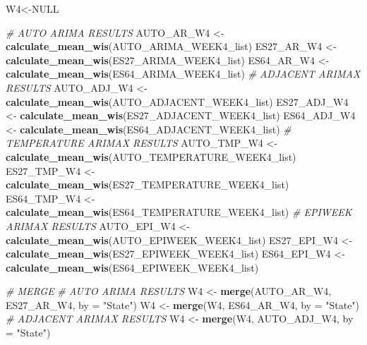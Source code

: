 \documentclass[
]{article}
\newenvironment{Shaded}{\begin{snugshade}}{\end{snugshade}}
\newcommand{\AttributeTok}[1]{\textcolor[rgb]{0.13,0.29,0.53}{#1}}
\newcommand{\CommentTok}[1]{\textcolor[rgb]{0.56,0.35,0.01}{\textit{#1}}}
\newcommand{\ConstantTok}[1]{\textcolor[rgb]{0.56,0.35,0.01}{#1}}
\newcommand{\FunctionTok}[1]{\textcolor[rgb]{0.13,0.29,0.53}{\textbf{#1}}}
\newcommand{\NormalTok}[1]{#1}
\newcommand{\OtherTok}[1]{\textcolor[rgb]{0.56,0.35,0.01}{#1}}
\newcommand{\StringTok}[1]{\textcolor[rgb]{0.31,0.60,0.02}{#1}}
\begin{document}
\begin{Shaded}
\begin{Highlighting}[]
\NormalTok{W4}\OtherTok{\textless{}{-}}\ConstantTok{NULL}

\CommentTok{\# AUTO ARIMA RESULTS}
\NormalTok{AUTO\_AR\_W4 }\OtherTok{\textless{}{-}} \FunctionTok{calculate\_mean\_wis}\NormalTok{(AUTO\_ARIMA\_WEEK4\_list)}
\NormalTok{ES27\_AR\_W4 }\OtherTok{\textless{}{-}} \FunctionTok{calculate\_mean\_wis}\NormalTok{(ES27\_ARIMA\_WEEK4\_list)}
\NormalTok{ES64\_AR\_W4 }\OtherTok{\textless{}{-}} \FunctionTok{calculate\_mean\_wis}\NormalTok{(ES64\_ARIMA\_WEEK4\_list)}
\CommentTok{\# ADJACENT ARIMAX RESULTS}
\NormalTok{AUTO\_ADJ\_W4 }\OtherTok{\textless{}{-}} \FunctionTok{calculate\_mean\_wis}\NormalTok{(AUTO\_ADJACENT\_WEEK4\_list)}
\NormalTok{ES27\_ADJ\_W4 }\OtherTok{\textless{}{-}} \FunctionTok{calculate\_mean\_wis}\NormalTok{(ES27\_ADJACENT\_WEEK4\_list)}
\NormalTok{ES64\_ADJ\_W4 }\OtherTok{\textless{}{-}} \FunctionTok{calculate\_mean\_wis}\NormalTok{(ES64\_ADJACENT\_WEEK4\_list)}
\CommentTok{\# TEMPERATURE ARIMAX RESULTS}
\NormalTok{AUTO\_TMP\_W4 }\OtherTok{\textless{}{-}} \FunctionTok{calculate\_mean\_wis}\NormalTok{(AUTO\_TEMPERATURE\_WEEK4\_list)}
\NormalTok{ES27\_TMP\_W4 }\OtherTok{\textless{}{-}} \FunctionTok{calculate\_mean\_wis}\NormalTok{(ES27\_TEMPERATURE\_WEEK4\_list)}
\NormalTok{ES64\_TMP\_W4 }\OtherTok{\textless{}{-}} \FunctionTok{calculate\_mean\_wis}\NormalTok{(ES64\_TEMPERATURE\_WEEK4\_list)}
\CommentTok{\# EPIWEEK ARIMAX RESULTS}
\NormalTok{AUTO\_EPI\_W4 }\OtherTok{\textless{}{-}} \FunctionTok{calculate\_mean\_wis}\NormalTok{(AUTO\_EPIWEEK\_WEEK4\_list)}
\NormalTok{ES27\_EPI\_W4 }\OtherTok{\textless{}{-}} \FunctionTok{calculate\_mean\_wis}\NormalTok{(ES27\_EPIWEEK\_WEEK4\_list)}
\NormalTok{ES64\_EPI\_W4 }\OtherTok{\textless{}{-}} \FunctionTok{calculate\_mean\_wis}\NormalTok{(ES64\_EPIWEEK\_WEEK4\_list)}

\CommentTok{\# MERGE}
\CommentTok{\# AUTO ARIMA RESULTS}
\NormalTok{W4 }\OtherTok{\textless{}{-}} \FunctionTok{merge}\NormalTok{(AUTO\_AR\_W4, ES27\_AR\_W4, }\AttributeTok{by =} \StringTok{"State"}\NormalTok{)}
\NormalTok{W4 }\OtherTok{\textless{}{-}} \FunctionTok{merge}\NormalTok{(W4, ES64\_AR\_W4, }\AttributeTok{by =} \StringTok{"State"}\NormalTok{)}
\CommentTok{\# ADJACENT ARIMAX RESULTS}
\NormalTok{W4 }\OtherTok{\textless{}{-}} \FunctionTok{merge}\NormalTok{(W4, AUTO\_ADJ\_W4, }\AttributeTok{by =} \StringTok{"State"}\NormalTok{)}
\end{Highlighting}
\end{Shaded}
\end{document}

